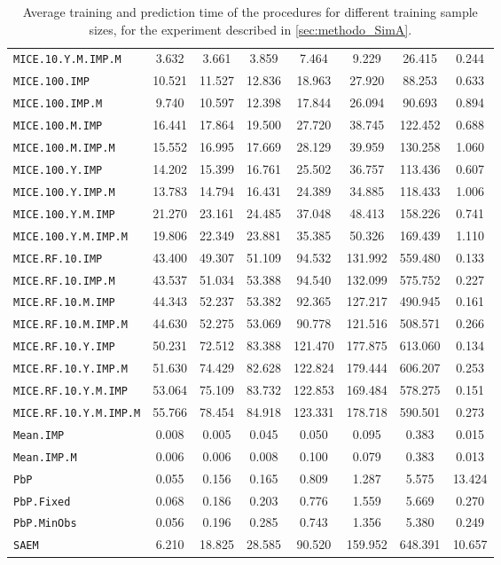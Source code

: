 \begin{table}[h!]
\begin{tabular}{l c c c c c c c}
\texttt{MICE.10.Y.M.IMP.M} & 3.632 & 3.661 & 3.859 & 7.464 & 9.229 & 26.415 & 0.244 \\
\texttt{MICE.100.IMP} & 10.521 & 11.527 & 12.836 & 18.963 & 27.920 & 88.253 & 0.633 \\
\texttt{MICE.100.IMP.M} & 9.740 & 10.597 & 12.398 & 17.844 & 26.094 & 90.693 & 0.894 \\
\texttt{MICE.100.M.IMP} & 16.441 & 17.864 & 19.500 & 27.720 & 38.745 & 122.452 & 0.688 \\
\texttt{MICE.100.M.IMP.M} & 15.552 & 16.995 & 17.669 & 28.129 & 39.959 & 130.258 & 1.060 \\
\texttt{MICE.100.Y.IMP} & 14.202 & 15.399 & 16.761 & 25.502 & 36.757 & 113.436 & 0.607 \\
\texttt{MICE.100.Y.IMP.M} & 13.783 & 14.794 & 16.431 & 24.389 & 34.885 & 118.433 & 1.006 \\
\texttt{MICE.100.Y.M.IMP} & 21.270 & 23.161 & 24.485 & 37.048 & 48.413 & 158.226 & 0.741 \\
\texttt{MICE.100.Y.M.IMP.M} & 19.806 & 22.349 & 23.881 & 35.385 & 50.326 & 169.439 & 1.110 \\
\texttt{MICE.RF.10.IMP} & 43.400 & 49.307 & 51.109 & 94.532 & 131.992 & 559.480 & 0.133 \\
\texttt{MICE.RF.10.IMP.M} & 43.537 & 51.034 & 53.388 & 94.540 & 132.099 & 575.752 & 0.227 \\
\texttt{MICE.RF.10.M.IMP} & 44.343 & 52.237 & 53.382 & 92.365 & 127.217 & 490.945 & 0.161 \\
\texttt{MICE.RF.10.M.IMP.M} & 44.630 & 52.275 & 53.069 & 90.778 & 121.516 & 508.571 & 0.266 \\
\texttt{MICE.RF.10.Y.IMP} & 50.231 & 72.512 & 83.388 & 121.470 & 177.875 & 613.060 & 0.134 \\
\texttt{MICE.RF.10.Y.IMP.M} & 51.630 & 74.429 & 82.628 & 122.824 & 179.444 & 606.207 & 0.253 \\
\texttt{MICE.RF.10.Y.M.IMP} & 53.064 & 75.109 & 83.732 & 122.853 & 169.484 & 578.275 & 0.151 \\
\texttt{MICE.RF.10.Y.M.IMP.M} & 55.766 & 78.454 & 84.918 & 123.331 & 178.718 & 590.501 & 0.273 \\
\texttt{Mean.IMP} & 0.008 & 0.005 & 0.045 & 0.050 & 0.095 & 0.383 & 0.015 \\
\texttt{Mean.IMP.M} & 0.006 & 0.006 & 0.008 & 0.100 & 0.079 & 0.383 & 0.013 \\
\texttt{PbP} & 0.055 & 0.156 & 0.165 & 0.809 & 1.287 & 5.575 & 13.424 \\
\texttt{PbP.Fixed} & 0.068 & 0.186 & 0.203 & 0.776 & 1.559 & 5.669 & 0.270 \\
\texttt{PbP.MinObs} & 0.056 & 0.196 & 0.285 & 0.743 & 1.356 & 5.380 & 0.249 \\
\texttt{SAEM} & 6.210 & 18.825 & 28.585 & 90.520 & 159.952 & 648.391 & 10.657 \\
\bottomrule
\end{tabular}
\caption{Average training and prediction time of the procedures for different training sample sizes, for the experiment described in \ref{sec:methodo_SimA}.}
\label{tab:runtimeSimA}
\end{table}

